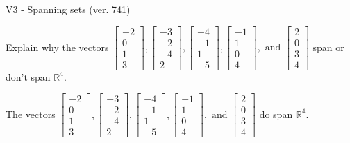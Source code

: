 \begin{exercise}
  \begin{exerciseTitle}V3 - Spanning sets (ver. 741)\end{exerciseTitle}
  \begin{exerciseStatement}
    Explain why the vectors \(\left[\begin{array}{r}
-2 \\
0 \\
1 \\
3
\end{array}\right] , \left[\begin{array}{r}
-3 \\
-2 \\
-4 \\
2
\end{array}\right] , \left[\begin{array}{r}
-4 \\
-1 \\
1 \\
-5
\end{array}\right] , \left[\begin{array}{r}
-1 \\
1 \\
0 \\
4
\end{array}\right] , \text{ and } \left[\begin{array}{r}
2 \\
0 \\
3 \\
4
\end{array}\right]\) span or don't span \(\mathbb{R}^4\). 
	


  \end{exerciseStatement}
  \begin{exerciseAnswer}
   The vectors \(\left[\begin{array}{r}
-2 \\
0 \\
1 \\
3
\end{array}\right] , \left[\begin{array}{r}
-3 \\
-2 \\
-4 \\
2
\end{array}\right] , \left[\begin{array}{r}
-4 \\
-1 \\
1 \\
-5
\end{array}\right] , \left[\begin{array}{r}
-1 \\
1 \\
0 \\
4
\end{array}\right] , \text{ and } \left[\begin{array}{r}
2 \\
0 \\
3 \\
4
\end{array}\right]\) 
  	 do  
	span \(\mathbb{R}^4\).
  



\end{exerciseAnswer}
\end{exercise}
